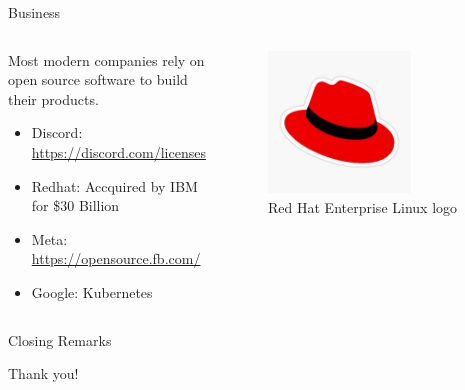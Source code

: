 \documentclass{beamer}
\begin{document}
\begin{frame}{Business}
	\begin{columns}
		\begin{column}{0.5\textwidth}
			Most modern companies rely on open source software to
			build their products.
			\begin{itemize}
				\item Discord: \url{https://discord.com/licenses}
				\item Redhat: Accquired by IBM for \$30 Billion
				\item Meta: \url{https://opensource.fb.com/}
				\item Google: Kubernetes
			\end{itemize}
		\end{column}
		\begin{column}{0.5\textwidth}
			\begin{figure}
				\centering
				\includegraphics[width=0.7\textwidth]{redhat.jpg}
				\caption{Red Hat Enterprise Linux logo}
			\end{figure}
		\end{column}
	\end{columns}
\end{frame}

\begin{frame}{Closing Remarks}
	\begin{center}
		\Huge Thank you!
	\end{center}
\end{frame}
\end{document}
